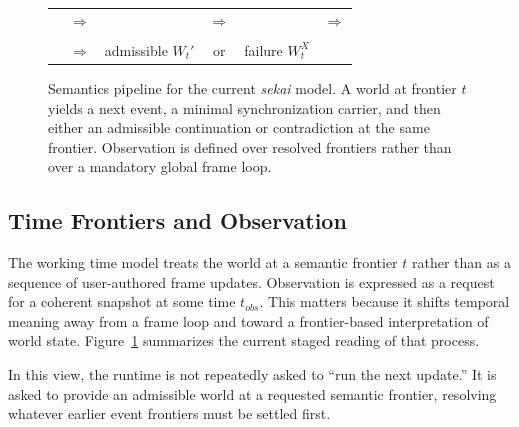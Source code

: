\begin{figure}[t]
  \centering
  \small
  \setlength{\tabcolsep}{3pt}
  \renewcommand{\arraystretch}{1.15}
  \begin{tabular}{c c c c c c}
    \fbox{\parbox[c][1.8em][c]{0.10\columnwidth}{\centering $W_t$}} &
    $\Rightarrow$ &
    \fbox{\parbox[c][1.8em][c]{0.16\columnwidth}{\centering $ev = Next(W_t)$}} &
    $\Rightarrow$ &
    \fbox{\parbox[c][1.8em][c]{0.15\columnwidth}{\centering $Sync(ev)$}} &
    $\Rightarrow$ \\
    \multicolumn{6}{c}{} \\
    \fbox{\parbox[c][1.8em][c]{0.15\columnwidth}{\centering $W_t^{ev}$}} &
    $\Rightarrow$ &
    \fbox{\parbox[c][2.8em][c]{0.16\columnwidth}{\centering admissible\\ $W_t'$}} &
    \multicolumn{1}{c}{or} &
    \fbox{\parbox[c][2.8em][c]{0.14\columnwidth}{\centering failure\\ $W_t^{X}$}} &
    \\
  \end{tabular}

  \vspace{0.4em}

  \caption{Semantics pipeline for the current \emph{sekai} model. A world at frontier $t$ yields a next event, a minimal synchronization carrier, and then either an admissible continuation or contradiction at the same frontier. Observation is defined over resolved frontiers rather than over a mandatory global frame loop.}
  \label{fig:semantics-pipeline}
\end{figure}

\subsection{Time Frontiers and Observation}

The working time model treats the world at a semantic frontier $t$ rather than as a sequence of user-authored frame updates.
Observation is expressed as a request for a coherent snapshot at some time $t_{obs}$.
This matters because it shifts temporal meaning away from a frame loop and toward a frontier-based interpretation of world state.
Figure~\ref{fig:semantics-pipeline} summarizes the current staged reading of that process.

In this view, the runtime is not repeatedly asked to ``run the next update.''
It is asked to provide an admissible world at a requested semantic frontier, resolving whatever earlier event frontiers must be settled first.

